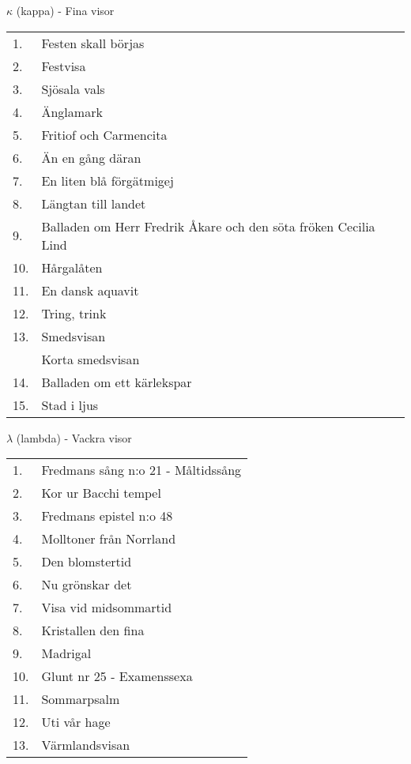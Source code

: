 \documentclass[a6paper,10pt]{article}
\begin{document}
\noindent
\Large $\kappa$ (kappa) - Fina visor
\vspace{-5pt}
\begin{table}[!h]
\begin{tabularx}{1\textwidth}{l X}
1.&Festen skall börjas\\
2.&Festvisa\\
3.&Sjösala vals\\
4.&Änglamark\\
5.&Fritiof och Carmencita\\
6.&Än en gång däran\\
7.&En liten blå förgätmigej\\
8.&Längtan till landet\\
9.&Balladen om Herr Fredrik Åkare och den söta fröken Cecilia
Lind\\
10.&Hårgalåten\\
11.&En dansk aquavit\\
12.&Tring, trink\\
13.&Smedsvisan\\
&Korta smedsvisan\\
14.&Balladen om ett kärlekspar\\
15.&Stad i ljus
\end{tabularx}
\end{table}
\newpage
\noindent
\Large $\lambda$ (lambda) - Vackra visor
\vspace{-5pt}
\begin{table}[!h]
\begin{tabularx}{1\textwidth}{l X}
1.&Fredmans sång n:o 21 - Måltidssång\\
2.&Kor ur Bacchi tempel\\
3.&Fredmans epistel n:o 48\\
4.&Molltoner från Norrland\\
5.&Den blomstertid\\
6.&Nu grönskar det \\
7.&Visa vid midsommartid\\
8.&Kristallen den fina\\
9.&Madrigal\\
10.&Glunt nr 25 - Examenssexa\\
11.&Sommarpsalm\\
12.&Uti vår hage\\
13.&Värmlandsvisan
\end{tabularx}
\end{table}
\end{document}
